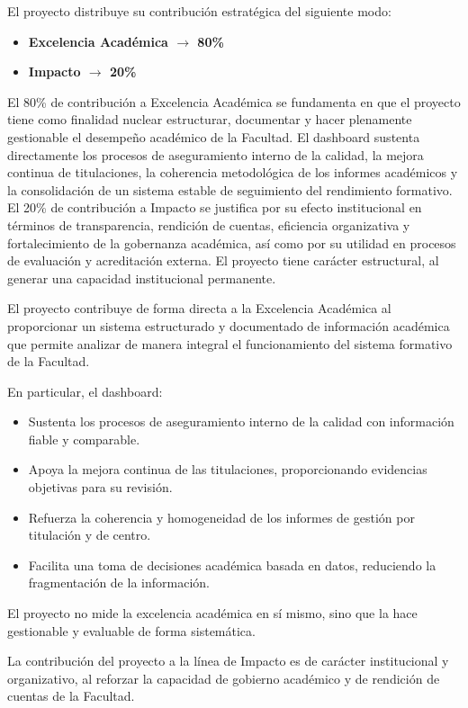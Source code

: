 \documentclass[11pt,a4paper]{scrreprt}
\begin{document}
\small
El proyecto distribuye su contribución estratégica del siguiente modo:
\begin{itemize}[noitemsep,topsep=2pt]
\item \textbf{Excelencia Académica $\rightarrow$ 80\%}
\item \textbf{Impacto $\rightarrow$ 20\%}
\end{itemize}
El 80\% de contribución a Excelencia Académica se fundamenta en que el proyecto tiene como finalidad nuclear estructurar, documentar y hacer plenamente gestionable el desempeño académico de la Facultad. El dashboard sustenta directamente los procesos de aseguramiento interno de la calidad, la mejora continua de titulaciones, la coherencia metodológica de los informes académicos y la consolidación de un sistema estable de seguimiento del rendimiento formativo. El 20\% de contribución a Impacto se justifica por su efecto institucional en términos de transparencia, rendición de cuentas, eficiencia organizativa y fortalecimiento de la gobernanza académica, así como por su utilidad en procesos de evaluación y acreditación externa. El proyecto tiene carácter estructural, al generar una capacidad institucional permanente.



\small
El proyecto contribuye de forma directa a la Excelencia Académica al proporcionar un sistema estructurado y documentado de información académica que permite analizar de manera integral el funcionamiento del sistema formativo de la Facultad.

En particular, el dashboard:
\begin{itemize}[noitemsep,topsep=2pt]
\item Sustenta los procesos de aseguramiento interno de la calidad con información fiable y comparable.
\item Apoya la mejora continua de las titulaciones, proporcionando evidencias objetivas para su revisión.
\item Refuerza la coherencia y homogeneidad de los informes de gestión por titulación y de centro.
\item Facilita una toma de decisiones académica basada en datos, reduciendo la fragmentación de la información.
\end{itemize}

El proyecto no mide la excelencia académica en sí mismo, sino que la hace gestionable y evaluable de forma sistemática.


\small
La contribución del proyecto a la línea de Impacto es de carácter institucional y organizativo, al reforzar la capacidad de gobierno académico y de rendición de cuentas de la Facultad.
\end{document}
